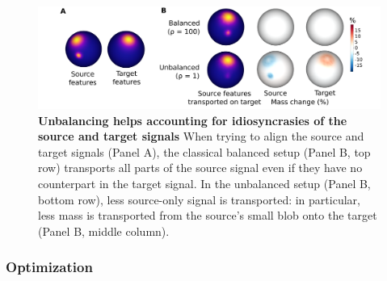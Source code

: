 \begin{figure}[t]
    \centering
    \includegraphics[width=1\columnwidth]{./Chapitre4/figures/toy_example.pdf}
    \caption{
        \textbf{Unbalancing helps accounting for idiosyncrasies of the source and target signals}
        When trying to align the source and target signals (Panel A),
        the classical balanced setup (Panel B, top row) transports all parts of
        the source signal even if they have no counterpart in the target signal.
        In the unbalanced setup (Panel B, bottom row), less source-only signal is transported:
        in particular, less mass is transported from the source's small blob onto the target
        (Panel B, middle column).
    }
    \label{fig:toy_example}
\end{figure}

\subsubsection{Optimization}

